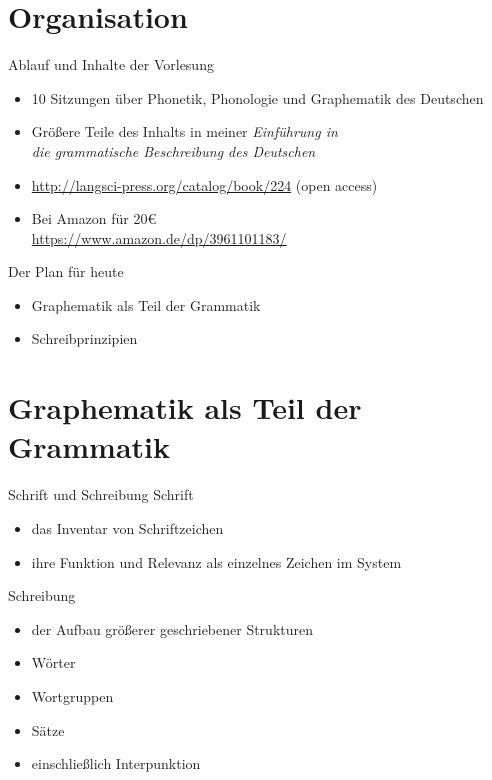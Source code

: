 
\section{Organisation}

\begin{frame}
  {Ablauf und Inhalte der Vorlesung}
  \begin{itemize}
    \item 10 Sitzungen über Phonetik, Phonologie und Graphematik des Deutschen 
    \item Größere Teile des Inhalts in meiner \alert{\textit{Einführung in\\
      die grammatische Beschreibung des Deutschen}} 
    \item \url{http://langsci-press.org/catalog/book/224} (\alert{open access})
      \vspace{\baselineskip}
    \item Bei Amazon für 20€\\
      \url{https://www.amazon.de/dp/3961101183/}
  \end{itemize}
\end{frame}

\begin{frame}
  {Der Plan für heute}
  \pause
  \begin{itemize}
    \item Graphematik als Teil der Grammatik
    \item Schreibprinzipien
  \end{itemize}
\end{frame}


\section[Graphematik]{Graphematik als Teil der Grammatik}

\begin{frame}
  {Schrift und Schreibung}
  \onslide<+->
  \onslide<+->
  \alert{Schrift}\\
  \Halbzeile
  \begin{itemize}[<+->]
    \item das Inventar von Schriftzeichen
    \item ihre Funktion und Relevanz als einzelnes Zeichen im System
  \end{itemize}
  \onslide<+->
  \Zeile
  \alert{Schreibung}\\
  \Halbzeile
  \begin{itemize}[<+->]
    \item der Aufbau größerer geschriebener Strukturen
    \item Wörter
    \item Wortgruppen
    \item Sätze
    \item einschließlich Interpunktion
  \end{itemize}
\end{frame}


